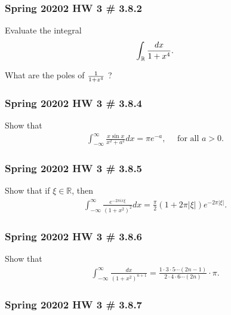 \hypertarget{spring-20202-hw-3-3.8.2}{%
\subsubsection{Spring 20202 HW 3 \#
3.8.2}\label{spring-20202-hw-3-3.8.2}}

Evaluate the integral
\begin{align*}
\int_{\mathbb{R}}{dx \over 1 + x^4}
.\end{align*}

What are the poles of \({1\over 1 + z^4}\) ?

\hypertarget{spring-20202-hw-3-3.8.4}{%
\subsubsection{Spring 20202 HW 3 \#
3.8.4}\label{spring-20202-hw-3-3.8.4}}

Show that
\begin{align*}
\int_{-\infty}^{\infty} \frac{x \sin x}{x^{2}+a^{2}} d x=\pi e^{-a}, \quad \text { for all } a>0
.\end{align*}

\hypertarget{spring-20202-hw-3-3.8.5}{%
\subsubsection{Spring 20202 HW 3 \#
3.8.5}\label{spring-20202-hw-3-3.8.5}}

Show that if \(\xi\in {\mathbb{R}}\), then
\begin{align*}
\int_{-\infty}^{\infty} \frac{e^{-2 \pi i x \xi}}{\left(1+x^{2}\right)^{2}} d x=\frac{\pi}{2}(1+2 \pi|\xi|) e^{-2 \pi|\xi|}
.\end{align*}

\hypertarget{spring-20202-hw-3-3.8.6}{%
\subsubsection{Spring 20202 HW 3 \#
3.8.6}\label{spring-20202-hw-3-3.8.6}}

Show that
\begin{align*}
\int_{-\infty}^{\infty} \frac{d x}{\left(1+x^{2}\right)^{n+1}}=\frac{1 \cdot 3 \cdot 5 \cdots(2 n-1)}{2 \cdot 4 \cdot 6 \cdots(2 n)} \cdot \pi
.\end{align*}

\hypertarget{spring-20202-hw-3-3.8.7}{%
\subsubsection{Spring 20202 HW 3 \#
3.8.7}\label{spring-20202-hw-3-3.8.7}}

